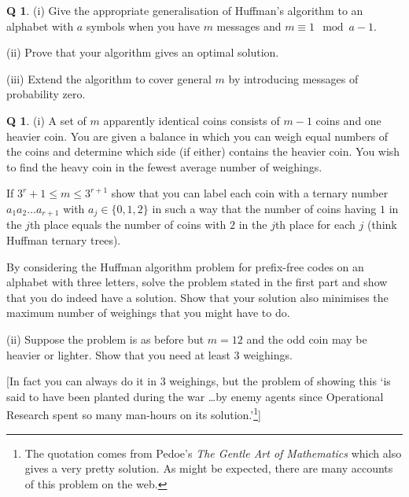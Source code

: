\documentclass[12pt,a4paper]{article}
\theoremstyle{plain}
\theoremstyle{definition}
\newtheorem{question}[theorem]{Q}
\begin{document}
    \begin{question}
        \label{C1.12}
        (i) Give the appropriate generalisation
        of Huffman's algorithm to an alphabet with $a$ symbols
        when you have $m$ messages and $m\equiv 1\mod{a-1}$.

        (ii) Prove that your algorithm gives an optimal
        solution.

        (iii) Extend the algorithm to cover general $m$ by
        introducing messages of probability zero.
    \end{question}
    \begin{question}
        \label{C1.13}
        (i) A set of $m$ apparently identical
        coins consists of $m-1$ coins and one heavier coin.
        You are given a balance in which you can weigh
        equal numbers of the coins and determine which side
        (if either) contains the heavier coin.
        You wish to find the heavy coin in the fewest
        average number of weighings.

        If $3^{r}+1\leq m\leq 3^{r+1}$ show that you can label
        each coin with a ternary number $a_{1}a_{2}\ldots a_{r+1}$
        with $a_{j}\in\{0,1,2\}$ in such a way that
        the number of coins
        having
        $1$ in the $j$th place
        equals the number of coins with $2$ in the $j$th place
        for each $j$
        (think Huffman ternary trees).

        By considering the Huffman algorithm problem for
        prefix-free codes on an alphabet with
        three letters, solve the problem stated in the first
        part and show that you do indeed
        have a solution. Show that your
        solution also minimises the maximum number
        of weighings that you might have to do.

        (ii) Suppose the problem is as before but
        $m=12$ and the odd coin may be heavier or lighter.
        Show that you need at least $3$ weighings.

        [In fact you can always do it in $3$ weighings, but
        the problem of showing this
        `is said to have been planted
        during the war \dots by enemy agents
        since Operational Research spent so many man-hours
        on its solution.'\footnote{The quotation comes
        from Pedoe's \emph{The Gentle Art of Mathematics}
        which also gives a very pretty solution.
        As might be expected, there are many accounts of this problem
        on the web.}]
    \end{question}
\end{document}
